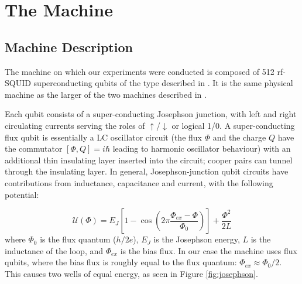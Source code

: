 \chapter{The \machine Machine}
\label{chap:machine}
\section{Machine Description}
The \machine machine on which our experiments were conducted is composed of 512 rf-SQUID superconducting qubits of the type described in \cite{qubit} \cite{dwave_nature}. It is the same physical machine as the larger of the two machines described in \cite{pudenz}.

Each qubit consists of a super-conducting Josephson junction, with left and right circulating currents serving the roles of $\uparrow$/$\downarrow$ or logical 1/0.  A super-conducting flux qubit is essentially a LC oscillator circuit (the flux $\Phi$ and the charge $Q$ have the commutator $[\Phi,Q]=i\hbar$ leading to harmonic oscillator behaviour) with an additional thin insulating layer inserted into the circuit; cooper pairs can tunnel through the insulating layer.  In general, Josephson-junction qubit circuits have contributions from inductance, capacitance and current, with the following potential:\cite{qc}

\begin{equation}
	\mathcal{U}(\Phi) = E_J\left[1 - \cos\left(2\pi \frac{\Phi_{ex}-\Phi}{\Phi_0}\right)\right] + \frac{\Phi^2}{2L}
\end{equation}
where $\Phi_0$ is the flux quantum ($h/2e$), $E_J$ is the Josephson energy, $L$ is the inductance of the loop, and $\Phi_{ex}$ is the bias flux.  In our case the \machine machine uses flux qubits, where the bias flux is roughly equal to the flux quantum: $\Phi_{ex} \approx \Phi_0/2$.  This causes two wells of equal energy, as seen in Figure \ref{fig:josephson}.

